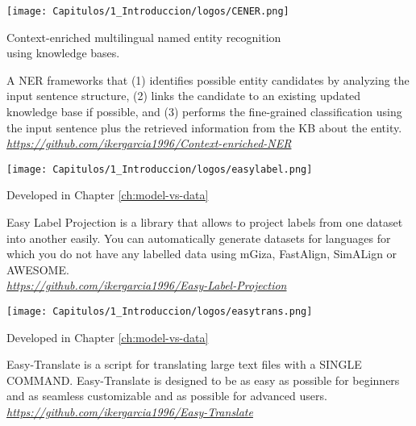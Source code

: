 \begin{resources}
    {
    \begin{adjustbox}{valign=c}
    \texttt{[image: Capitulos/1\_Introduccion/logos/CENER.png]}
    \end{adjustbox}
    \begin{adjustbox}{valign=c}
    \begin{minipage}{\textwidth}
    Context-enriched multilingual named entity recognition \\ using knowledge bases.
    \end{minipage}
    \end{adjustbox}
    }
    A NER frameworks that (1) identifies possible entity candidates by analyzing the input sentence structure, (2) links the candidate to an existing updated knowledge base if possible, and (3) performs the fine-grained classification using the input sentence plus the retrieved information from the KB about the entity. \\
    \textit{\href{https://github.com/ikergarcia1996/Context-enriched-NER}{https://github.com/ikergarcia1996/Context-enriched-NER}}
\end{resources}

\begin{resources}
    {
    \texttt{[image: Capitulos/1\_Introduccion/logos/easylabel.png]}
    }
    \begin{resourcessmall}
    Developed in Chapter \ref{ch:model-vs-data}
    \end{resourcessmall}
    Easy Label Projection is a library that allows to project labels from one dataset into another easily. You can automatically generate datasets for languages for which you do not have any labelled data using mGiza, FastAlign, SimALign or AWESOME. \\
    \textit{\href{https://github.com/ikergarcia1996/Easy-Label-Projection}{https://github.com/ikergarcia1996/Easy-Label-Projection}}
\end{resources}

\begin{resources}
    {
    \texttt{[image: Capitulos/1\_Introduccion/logos/easytrans.png]}
    }
    \begin{resourcessmall}
    Developed in Chapter \ref{ch:model-vs-data}
    \end{resourcessmall}
    Easy-Translate is a script for translating large text files with a SINGLE COMMAND. Easy-Translate is designed to be as easy as possible for beginners and as seamless customizable and as possible for advanced users. \\
    \textit{\href{https://github.com/ikergarcia1996/Easy-Translate}{https://github.com/ikergarcia1996/Easy-Translate}}
\end{resources}

